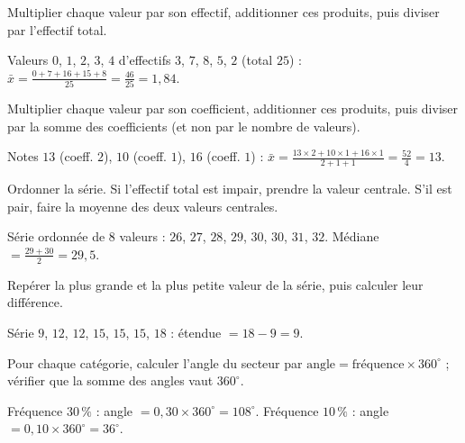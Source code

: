 Multiplier chaque valeur par son effectif, additionner ces produits, puis diviser par
l'effectif total.
\begin{exemple}
Valeurs $0$, $1$, $2$, $3$, $4$ d'effectifs $3$, $7$, $8$, $5$, $2$ (total $25$) :
$\bar{x}=\frac{0+7+16+15+8}{25}=\frac{46}{25}=1{,}84$.
\end{exemple}

Multiplier chaque valeur par son coefficient, additionner ces produits, puis diviser par la
somme des coefficients (et non par le nombre de valeurs).
\begin{exemple}
Notes $13$ (coeff. $2$), $10$ (coeff. $1$), $16$ (coeff. $1$) :
$\bar{x}=\frac{13\times2+10\times1+16\times1}{2+1+1}=\frac{52}{4}=13$.
\end{exemple}

Ordonner la série. Si l'effectif total est impair, prendre la valeur centrale. S'il est
pair, faire la moyenne des deux valeurs centrales.
\begin{exemple}
Série ordonnée de $8$ valeurs : $26$, $27$, $28$, $29$, $30$, $30$, $31$, $32$. Médiane
$=\frac{29+30}{2}=29{,}5$.
\end{exemple}

Repérer la plus grande et la plus petite valeur de la série, puis calculer leur différence.
\begin{exemple}
Série $9$, $12$, $12$, $15$, $15$, $15$, $18$ : étendue $=18-9=9$.
\end{exemple}

Pour chaque catégorie, calculer l'angle du secteur par $\text{angle}=\text{fréquence}\times360^{\circ}$ ;
vérifier que la somme des angles vaut $360^{\circ}$.
\begin{exemple}
Fréquence $30\,\%$ : angle $=0{,}30\times360^{\circ}=108^{\circ}$. Fréquence $10\,\%$ :
angle $=0{,}10\times360^{\circ}=36^{\circ}$.
\end{exemple}

